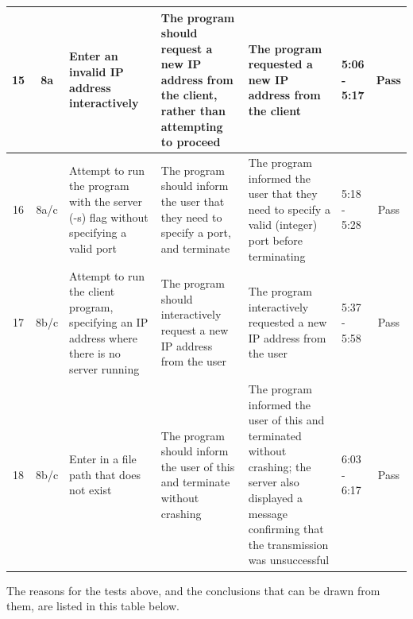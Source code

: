 \documentclass[../main.tex]{subfiles}
\begin{document}
\begin{longtable}{|c|c|p{3.1cm}|p{3.1cm}|p{3.4cm}|p{0.9cm}|c|}
\hline
15 & 8a & Enter an invalid IP address interactively & The program should request a new IP address from the client, rather than attempting to proceed & The program requested a new IP address from the client & 5:06 - 5:17 & Pass \\
\hline
16 & 8a/c & Attempt to run the program with the server (-s) flag without specifying a valid port & The program should inform the user that they need to specify a port, and terminate & The program informed the user that they need to specify a valid (integer) port before terminating & 5:18 - 5:28 & Pass \\
\hline
17 & 8b/c & Attempt to run the client program, specifying an IP address where there is no server running & The program should interactively request a new IP address from the user & The program interactively requested a new IP address from the user & 5:37 - 5:58 & Pass \\
\hline
18 & 8b/c & Enter in a file path that does not exist & The program should inform the user of this and terminate without crashing & The program informed the user of this and terminated without crashing; the server also displayed a message confirming that the transmission was unsuccessful & 6:03 - 6:17 & Pass \\
\hline
\end{longtable}

The reasons for the tests above, and the conclusions that can be drawn from them, are listed in this table below.
\end{document}
